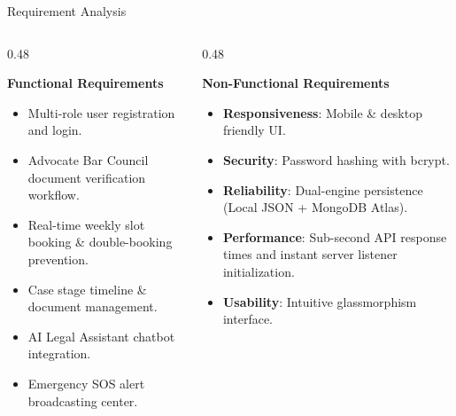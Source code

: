\documentclass[10pt,aspectratio=169]{beamer}
\begin{document}
\begin{frame}{Requirement Analysis}
  \begin{columns}[T]
    \begin{column}{0.48\textwidth}
      \begin{block}{\textbf{Functional Requirements}}
        \begin{itemize}
          \item Multi-role user registration and login.
          \item Advocate Bar Council document verification workflow.
          \item Real-time weekly slot booking \& double-booking prevention.
          \item Case stage timeline \& document management.
          \item AI Legal Assistant chatbot integration.
          \item Emergency SOS alert broadcasting center.
        \end{itemize}
      \end{block}
    \end{column}
    
    \begin{column}{0.48\textwidth}
      \begin{block}{\textbf{Non-Functional Requirements}}
        \begin{itemize}
          \item \textbf{Responsiveness}: Mobile \& desktop friendly UI.
          \item \textbf{Security}: Password hashing with bcrypt.
          \item \textbf{Reliability}: Dual-engine persistence (Local JSON + MongoDB Atlas).
          \item \textbf{Performance}: Sub-second API response times and instant server listener initialization.
          \item \textbf{Usability}: Intuitive glassmorphism interface.
        \end{itemize}
      \end{block}
    \end{column}
  \end{columns}
\end{frame}
\end{document}
